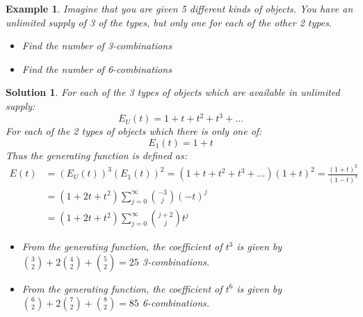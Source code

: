 \documentclass[12pt, letterpaper, onecolumn, conference, final]{IEEEtran}
\theoremstyle{definition}
\theoremstyle{plain}
\newtheorem{example}{Example}[section]
\newtheorem{solution}{Solution}[section]
\begin{document}
\newpage
\begin{example}
Imagine that you are given 5 different kinds of objects. You have an unlimited supply of 3 of the types, but only one for each of the other 2 types.
\begin{itemize}

\vspace{.2cm}
\item[(a)]
Find the number of 3-combinations

\vspace{.2cm}
\item[(b)]
Find the number of 6-combinations

\end{itemize}
\end{example}
\begin{solution}
For each of the 3 types of objects which are available in unlimited supply:
\begin{equation*}
E_U(t) = 1 + t + t^2 + t^3 + \dots
\end{equation*}
For each of the 2 types of objects which there is only one of:
\begin{equation*}
E_1(t) = 1 + t
\end{equation*}
Thus the generating function is defined as:
\begin{equation*}
\begin{split}
E(t) &= (E_U(t))^3(E_1(t))^2 = (1 + t + t^2 + t^3 + \dots)(1 + t)^2 = \frac{(1+t)^2}{(1-t)^3} \\
&= (1 + 2t + t^2) \sum_{j=0}^\infty {-3 \choose j} (-t)^j \\
&= (1 + 2t + t^2) \sum_{j=0}^\infty {j+2 \choose j} t^j
\end{split}
\end{equation*}
\begin{itemize}

\vspace{.2cm}
\item[(a)]
From the generating function, the coefficient of $t^3$ is given by ${3 \choose 2} + 2{4 \choose 2} + {5 \choose 2} = 25$ 3-combinations.

\vspace{.2cm}
\item[(b)]
From the generating function, the coefficient of $t^6$ is given by ${6 \choose 2} + 2{7 \choose 2} + {8 \choose 2} = 85$ 6-combinations.

\end{itemize}
\end{solution}
\end{document}

